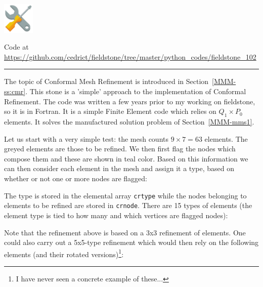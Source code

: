 \includegraphics[height=1.5cm]{images/pictograms/tools}




\begin{center}
Code at \url{https://github.com/cedrict/fieldstone/tree/master/python_codes/fieldstone_102}
\end{center}

\par\noindent\rule{\textwidth}{0.4pt}


The topic of Conformal Mesh Refinement is introduced in Section~\ref{MMM-ss:cmr}.
This stone is a 'simple' approach to the implementation of Conformal Refinement. The code was written 
a few years prior to my working on fieldstone, so it is in Fortran. It is a 
simple Finite Element code which relies on $Q_1\times P_0$ elements. It solves the 
manufactured solution problem of Section~\ref{MMM-mms1}.

Let us start with a very simple test: the mesh counts $9\times 7=63$ elements.
The greyed elements are those to be refined. We then first flag 
the nodes which compose them and these are shown in teal color.
Based on this information we can then consider each element in the mesh and assign it a type, 
based on whether or not one or more nodes are flagged: 

\begin{center}

\end{center}

The type is stored in the elemental array {\tt crtype} while the nodes belonging to elements 
to be refined are stored in {\tt crnode}.
There are 15 types of elements (the element type is tied to how many and which vertices are flagged nodes):

\begin{center}

\end{center}

Note that the refinement above is based on a 3x3 refinement of elements. One could also carry out a 5x5-type
refinement which would then rely on the following elements (and their rotated versions)\footnote{I have never
seen a concrete example of these...}:
\begin{center}

\end{center}


